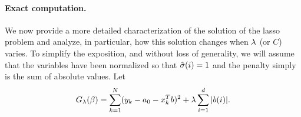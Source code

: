 


\paragraph{Exact computation.}

We now provide a more detailed characterization of the solution of the lasso problem and analyze, in particular, how this solution changes when
$\lambda$ (or $C$) varies. To simplify the exposition, and without loss of generality, we will
assume that the variables have been normalized so that $\hat {\sigma}(i) = 1$
and the penalty simply is the sum of absolute values. 
Let
$$
G_\lambda(\beta) = \sum_{k=1}^N (y_k - {a_0} - x_k^Tb)^2 + \lambda \sum_{i=1}^d |b(i)|.
$$



